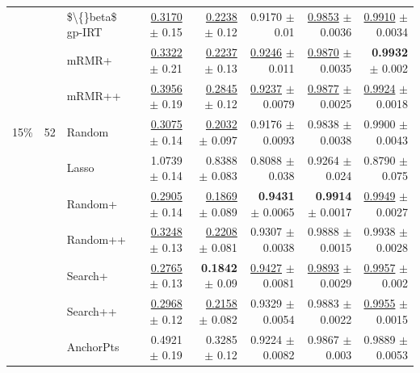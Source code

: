 \begin{longtable}{llp{}rrrrr}
 &  & \$\textbackslash\{\}beta\$ gp-IRT & \underline{0.3170} {\scriptsize $\pm$ 0.15} & \underline{0.2238} {\scriptsize $\pm$ 0.12} & 0.9170 {\scriptsize $\pm$ 0.01} & \underline{0.9853} {\scriptsize $\pm$ 0.0036} & \underline{0.9910} {\scriptsize $\pm$ 0.0034} \\
 &  & mRMR+ & \underline{0.3322} {\scriptsize $\pm$ 0.21} & \underline{0.2237} {\scriptsize $\pm$ 0.13} & \underline{0.9246} {\scriptsize $\pm$ 0.011} & \underline{0.9870} {\scriptsize $\pm$ 0.0035} & \textbf{0.9932} {\scriptsize $\pm$ 0.002} \\
 &  & mRMR++ & \underline{0.3956} {\scriptsize $\pm$ 0.19} & \underline{0.2845} {\scriptsize $\pm$ 0.12} & \underline{0.9237} {\scriptsize $\pm$ 0.0079} & \underline{0.9877} {\scriptsize $\pm$ 0.0025} & \underline{0.9924} {\scriptsize $\pm$ 0.0018} \\
\midrule
15\% & 52 & Random & \underline{0.3075} {\scriptsize $\pm$ 0.14} & \underline{0.2032} {\scriptsize $\pm$ 0.097} & 0.9176 {\scriptsize $\pm$ 0.0093} & 0.9838 {\scriptsize $\pm$ 0.0038} & 0.9900 {\scriptsize $\pm$ 0.0043} \\
 &  & Lasso & 1.0739 {\scriptsize $\pm$ 0.14} & 0.8388 {\scriptsize $\pm$ 0.083} & 0.8088 {\scriptsize $\pm$ 0.038} & 0.9264 {\scriptsize $\pm$ 0.024} & 0.8790 {\scriptsize $\pm$ 0.075} \\
 &  & Random+ & \underline{0.2905} {\scriptsize $\pm$ 0.14} & \underline{0.1869} {\scriptsize $\pm$ 0.089} & \textbf{0.9431} {\scriptsize $\pm$ 0.0065} & \textbf{0.9914} {\scriptsize $\pm$ 0.0017} & \underline{0.9949} {\scriptsize $\pm$ 0.0027} \\
 &  & Random++ & \underline{0.3248} {\scriptsize $\pm$ 0.13} & \underline{0.2208} {\scriptsize $\pm$ 0.081} & 0.9307 {\scriptsize $\pm$ 0.0038} & 0.9888 {\scriptsize $\pm$ 0.0015} & 0.9938 {\scriptsize $\pm$ 0.0028} \\
 &  & Search+ & \underline{0.2765} {\scriptsize $\pm$ 0.13} & \textbf{0.1842} {\scriptsize $\pm$ 0.09} & \underline{0.9427} {\scriptsize $\pm$ 0.0081} & \underline{0.9893} {\scriptsize $\pm$ 0.0029} & \underline{0.9957} {\scriptsize $\pm$ 0.002} \\
 &  & Search++ & \underline{0.2968} {\scriptsize $\pm$ 0.12} & \underline{0.2158} {\scriptsize $\pm$ 0.082} & 0.9329 {\scriptsize $\pm$ 0.0054} & 0.9883 {\scriptsize $\pm$ 0.0022} & \underline{0.9955} {\scriptsize $\pm$ 0.0015} \\
 &  & AnchorPts & 0.4921 {\scriptsize $\pm$ 0.19} & 0.3285 {\scriptsize $\pm$ 0.12} & 0.9224 {\scriptsize $\pm$ 0.0082} & 0.9867 {\scriptsize $\pm$ 0.003} & 0.9889 {\scriptsize $\pm$ 0.0053} \\

\end{longtable}
